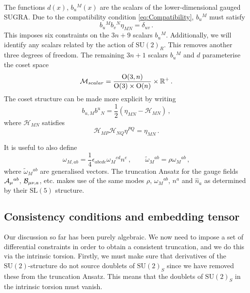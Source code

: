 \documentclass{PoS}
\newcommand{\ON}[1]{\mathrm{O}( #1 )}
\newcommand{\SU}[1]{\mathrm{SU}( #1 )}
\newcommand{\SL}[1]{\mathrm{SL}( #1 )}
\newcommand{\TA}{{\cal A}}
\newcommand{\TB}{{\cal B}}
\newcommand{\tomega}{\tilde{\omega}}
\newcommand{\gH}{\mathcal{H}}
\begin{document}
The functions $d(x)$, $b_u{}^M(x)$ are the scalars of the lower-dimensional gauged SUGRA. Due to the compatibility condition \eqref{eq:Compatibility}, $b_u{}^M$ must satisfy
\begin{equation}
 b_u{}^M b_v{}^N \eta_{MN} = \delta_{uv} \,.
\end{equation}
This imposes six constraints on the $3n+9$ scalars $b_u{}^M$. Additionally, we will identify any scalars related by the action of $\SU{2}_R$. This removes another three degrees of freedom. The remaining $3n+1$ scalars $b_u{}^M$ and $d$ parameterise the coset space
\begin{equation}
 {\cal M}_{scalar} = \frac{\ON{3,n}}{\ON{3}\times\ON{n}} \times \mathbb{R}^+ \,.
\end{equation}
The coset structure can be made more explicit by writing
\begin{equation}
 b_{u,M} b^u{}_N = \frac12 \left( \eta_{MN} - \gH_{MN} \right) \,,
\end{equation}
where $\gH_{MN}$ satisfies
\begin{equation}
 \gH_{MP} \gH_{NQ} \eta^{PQ} = \eta_{MN} \,.
\end{equation}

It is useful to also define
\begin{equation} 
 \omega_{M,ab} = \frac14 \epsilon_{abcde} \omega_M{}^{cd} n^e \,, \qquad  \tomega_M{}^{ab} = \rho \omega_M{}^{ab} \,,
\end{equation}
where $\tomega_M{}^{ab}$ are generalised vectors. The truncation Ansatz for the gauge fields $\TA_\mu{}^{ab}$, $\TB_{\mu\nu,a}$, etc. makes use of the same modes $\rho$, $\omega_M{}^{ab}$, $n^a$ and $\hat{n}_a$ as determined by their $\SL{5}$ structure.

\subsection{Consistency conditions and embedding tensor}
Our discussion so far has been purely algebraic. We now need to impose a set of differential constraints in order to obtain a consistent truncation, and we do this via the intrinsic torsion. Firstly, we must make sure that derivatives of the $\SU{2}$-structure do not source doublets of $\SU{2}_S$ since we have removed these from the truncation Ansatz. This means that the doublets of $\SU{2}_S$ in the intrinsic torsion must vanish.
\end{document}
